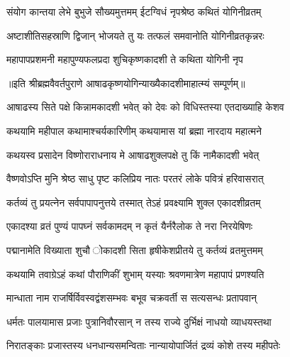 \twolineshloka
{संयोग कान्तया लेभे बुभुजे सौख्यमुत्तमम्}
{ईटग्विधं नृपश्रेष्ठ कथितं योगिनीव्रतम्} %

\twolineshloka
{अष्टाशीतिसहस्राणि द्विजान् भोजयते तु यः}
{तत्फलं समवानोति योगिनीव्रतकृन्नरः} %

\twolineshloka
{महापापप्रशमनी महापुण्यफलप्रदा}
{शुचिकृष्णकादशी ते कथिता योगिनी नृप} %

॥इति श्रीब्रह्मवैवर्तपुराणे आषाढकृष्णयोगिन्याख्यैकादशीमाहात्म्यं सम्पूर्णम्॥


\hyperref[sec:ekadashi_mahatmyam_vrata_raja]{\closesub}
\clearpage

\label{sec:vrata-raja-ashadha-shukla-shayani}


\twolineshloka
{आषाढस्य सिते पक्षे किन्नामकादशी भवेत्}
{को देवः को विधिस्तस्या एतदाख्याहि केशव} %


\twolineshloka
{कथयामि महीपाल कथामाश्चर्यकारिणीम्}
{कथयामास यां ब्रह्मा नारदाय महात्मने} %


\twolineshloka
{कथयस्व प्रसादेन विष्णोराराधनाय मे}
{आषाढशुक्लपक्षे तु किं नामैकादशी भवेत्} %


\twolineshloka
{वैष्णवोऽप्ति मुनि श्रेष्ठ साधु पृष्ट कलिप्रिय}
{नातः परतरं लोके पवित्रं हरिवासरात्} %

\twolineshloka
{कर्तव्यं तु प्रयत्नेन सर्वपापापनुत्तये}
{तस्मात् तेऽहं प्रवक्ष्यामि शुक्ल एकादशीव्रतम्} %

\twolineshloka
{एकादश्या व्रतं पुण्यं पापघ्नं सर्वकामदम्}
{न कृतं यैर्नरैलोक ते नरा निरयेषिणः} %

\twolineshloka
{पद्मानामेति विख्याता शुचौ ोकादशी सिता}
{हृषीकेशप्रीतये तु कर्तव्यं व्रतमुत्तमम्} %

\twolineshloka
{कथयामि तवाग्रेऽहं कथां पौराणिकीं शुभाम्}
{यस्याः श्रवणमात्रेण महापापं प्रणश्यति} %

\twolineshloka
{मान्धाता नाम राजर्षिर्विवस्वद्वंशसम्भवः}
{बभूव चक्रवर्ती स सत्यसन्धः प्रतापवान्} %

\twolineshloka
{धर्मतः पालयामास प्रजाः पुत्रानिवौरसान्}
{न तस्य राज्ये दुर्भिक्षं नाधयो व्याधयस्तथा} %

\twolineshloka
{निरातङ्काः प्रजास्तस्य धनधान्यसमन्विताः}
{नान्यायोपार्जितं द्रव्यं कोशे तस्य महीपतेः} %

